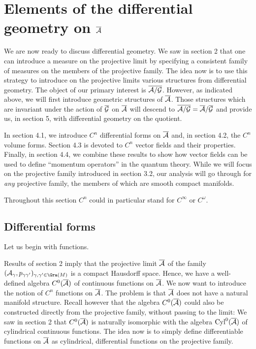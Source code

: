 \section{Elements of the differential geometry on ${\overline {{\cal A}}}$}

We are now ready to discuss differential geometry. We saw in section 2
that one can introduce a measure on the projective limit by specifying
a consistent family of measures on the members of the projective
family. The idea now is to use this strategy to introduce on the
projective limits various structures from differential geometry.  The
object of our primary interest is $\overline{{\cal A}/{\cal G}}$. However, as indicated above,
we will first introduce geometric structures of ${\overline {{\cal A}}}$.  Those
structures which are invariant under the action of ${\overline {{\cal G}}}$ on ${\overline {{\cal A}}}$ will
descend to $\overline{{\cal A}/{\cal G}} = {\overline {{\cal A}}}/{\overline {{\cal G}}}$ and provide us, in section 5, with
differential geometry on the quotient.

In section 4.1, we introduce $C^n$ differential forms on ${\overline {{\cal A}}}$ and, in
section 4.2, the $C^n$ volume forms. Section 4.3 is devoted to $C^n$
vector fields and their properties. Finally, in section 4.4, we
combine these results to show how vector fields can be used to define
``momentum operators'' in the quantum theory. While we will focus on
the projective family introduced in section 3.2, our analysis will go
through for {\it any} projective family, the members of which are
smooth compact manifolds.

Throughout this section $C^n$ could in particular stand for $C^\infty$
or $C^\omega$. 

\subsection{Differential forms}

Let us begin with functions. 

Results of section 2 imply that the projective limit ${\overline {{\cal A}}}$ of the
family $(\A_\g, p_{\g \g'})_{\g,\g'\in\Gra(\S)}$ is a compact
Hausdorff space. Hence, we have a well-defined algebra $C^0({\overline {{\cal A}}})$ of
continuous functions on ${\overline {{\cal A}}}$. We now want to introduce the notion of
$C^n$ functions on ${\overline {{\cal A}}}$. The problem is that ${\overline {{\cal A}}}$ does not have a
natural manifold structure. Recall however that the algebra $C^0({\overline {{\cal A}}})$
could also be constructed directly from the projective family, without
passing to the limit: We saw in section 2 that $C^0({\overline {{\cal A}}})$ is naturally
isomorphic with the algebra ${\rm Cyl}^0 ({\overline {{\cal A}}})$ of cylindrical continuous
functions. The idea now is to simply define differentiable functions
on ${\overline {{\cal A}}}$ as cylindrical, differential functions on the projective
family.

